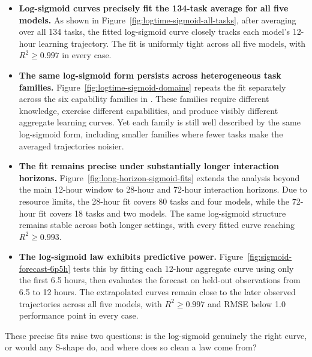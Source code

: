 \begin{itemize}
    \item \textbf{Log-sigmoid curves precisely fit the 134-task average for all
    five models.}
    As shown in Figure~\ref{fig:logtime-sigmoid-all-tasks}, after averaging
    over all 134 tasks, the fitted log-sigmoid curve closely tracks each
    model's 12-hour learning trajectory. The fit is uniformly tight across all
    five models, with $R^2 \geq 0.997$ in every case.

    \item \textbf{The same log-sigmoid form persists across heterogeneous task families.}
    Figure~\ref{fig:logtime-sigmoid-domains} repeats the fit separately across
    the six capability families in \benchmark{}. These families require different knowledge,
    exercise different capabilities, and produce visibly different aggregate
    learning curves. Yet each family is still well described by the same
    log-sigmoid form, including smaller families where fewer tasks make the
    averaged trajectories noisier.

    \item \textbf{The fit remains precise under substantially longer
    interaction horizons.}
    Figure~\ref{fig:long-horizon-sigmoid-fits} extends the analysis beyond the
    main 12-hour window to 28-hour and 72-hour interaction horizons. Due to
    resource limits, the 28-hour fit covers 80 tasks and four models, while
    the 72-hour fit covers 18 tasks and two models. The same log-sigmoid
    structure remains stable across both longer settings, with every fitted
    curve reaching $R^2 \geq 0.993$.

    \item \textbf{The log-sigmoid law exhibits predictive power.}
    Figure~\ref{fig:sigmoid-forecast-6p5h} tests this by fitting each
    12-hour aggregate curve using only the first 6.5 hours, then evaluates the forecast on
    held-out observations from 6.5 to 12 hours. The extrapolated curves remain
    close to the later observed trajectories across all five models, with
    $R^2 \geq 0.997$ and RMSE below 1.0 performance point in every case.

\end{itemize}

These precise fits raise two questions: is the log-sigmoid genuinely the right curve, or would any S-shape do, and where does so clean a law come from?

